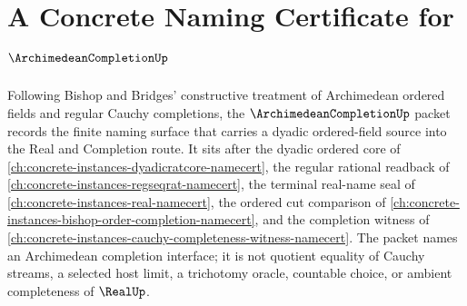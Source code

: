 \chapter{A Concrete Naming Certificate for $\ArchimedeanCompletionUp$}
\label{ch:concrete-instances-archimedean-completion-namecert}

Following Bishop and Bridges' constructive treatment of Archimedean ordered fields and regular Cauchy completions, the $\ArchimedeanCompletionUp$ packet records the finite naming surface that carries a dyadic ordered-field source into the Real and Completion route. It sits after the dyadic ordered core of \autoref{ch:concrete-instances-dyadicratcore-namecert}, the regular rational readback of \autoref{ch:concrete-instances-regseqrat-namecert}, the terminal real-name seal of \autoref{ch:concrete-instances-real-namecert}, the ordered cut comparison of \autoref{ch:concrete-instances-bishop-order-completion-namecert}, and the completion witness of \autoref{ch:concrete-instances-cauchy-completeness-witness-namecert}. The packet names an Archimedean completion interface; it is not quotient equality of Cauchy streams, a selected host limit, a trichotomy oracle, countable choice, or ambient completeness of $\RealUp$.

